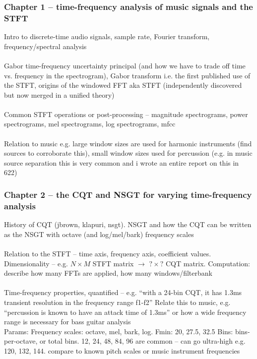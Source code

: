 \documentclass[usenames,dvipsnames]{beamer}
\begin{document}
\begin{frame}
	\frametitle{Chapter 1 -- time-frequency analysis of music signals and the STFT}
	Intro to discrete-time audio signals, sample rate, Fourier transform, frequency/spectral analysis\\\ \\
	Gabor time-frequency uncertainty principal (and how we have to trade off time vs. frequency in the spectrogram), Gabor transform i.e. the first published use of the STFT, origins of the windowed FFT aka STFT (independently discovered but now merged in a unified theory)\\\ \\
	Common STFT operations or post-processing -- magnitude spectrograms, power spectrograms, mel spectrograms, log spectrograms, mfcc\\\ \\
	Relation to music e.g. large window sizes are used for harmonic instruments (find sources to corroborate this), small window sizes used for percussion (e.g. in music source separation this is very common and i wrote an entire report on this in 622)
\end{frame}

\begin{frame}
	\frametitle{Chapter 2 -- the CQT and NSGT for varying time-frequency analysis}
	History of CQT (jbrown, klapuri, nsgt). NSGT and how the CQT can be written as the NSGT with octave (and log/mel/bark) frequency scales\\\ \\
	Relation to the STFT -- time axis, frequency axis, coefficient values. Dimensionality -- e.g. $N \times M$  STFT matrix $\rightarrow$ $? \times ?$ CQT matrix. Computation: describe how many FFTs are applied, how many windows/filterbank\\\ \\
	Time-frequency properties, quantified -- e.g. ``with a 24-bin CQT, it has 1.3ms transient resolution in the frequency range f1-f2'' Relate this to music, e.g. ``percussion is known to have an attack time of 1.3ms'' or how a wide frequency range is necessary for bass guitar analysis\\
Params: Frequency scales: octave, mel, bark, log. Fmin: 20, 27.5, 32.5 Bins: bins-per-octave, or total bins. 12, 24, 48, 84, 96 are common -- can go ultra-high e.g. 120, 132, 144. compare to known pitch scales or music instrument frequencies
\end{frame}
\end{document}
